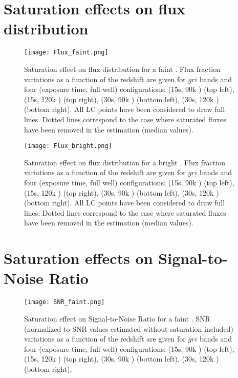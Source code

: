 \begin{appendices}
\section{Saturation effects on flux distribution}

\begin{figure}[htbp]
\begin{center}
  \texttt{[image: Flux\_faint.png]}
 \caption{Saturation effect on flux distribution for a faint \sne. Flux fraction variations as a function of the redshift are given for $gri$ bands and four (exposure time, full well) configurations: (15s, 90k \pe) (top left),  (15s, 120k \pe) (top right), (30s, 90k \pe) (bottom left),  (30s, 120k \pe) (bottom right). All LC points have been considered to draw full lines. Dotted lines correspond to the case where saturated fluxes have been removed in the estimation (median values).}\label{fig:fluxfaint}
\end{center}
\end{figure}

\begin{figure}[htbp]
\begin{center}
  \texttt{[image: Flux\_bright.png]}
  \caption{Saturation effect on flux distribution for a bright \sne. Flux fraction variations as a function of the redshift are given for $gri$ bands and four (exposure time, full well) configurations: (15s, 90k \pe) (top left),  (15s, 120k \pe) (top right), (30s, 90k \pe) (bottom left),  (30s, 120k \pe) (bottom right). All LC points have been considered to draw full lines. Dotted lines correspond to the case where saturated fluxes have been removed in the estimation (median values).}\label{fig:fluxbright}
  
\end{center}
\end{figure}
\newpage
\section{Saturation effects on Signal-to-Noise Ratio}

\begin{figure}[htbp]
\begin{center}
  \texttt{[image: SNR\_faint.png]}
 \caption{Saturation effect on Signal-to-Noise Ratio for a faint \sne. SNR (normalized to SNR values estimated without saturation included) variations as a function of the redshift are given for $gri$ bands and four (exposure time, full well) configurations: (15s, 90k \pe) (top left),  (15s, 120k \pe) (top right), (30s, 90k \pe) (bottom left),  (30s, 120k \pe) (bottom right),}\label{fig:snrfaint}
\end{center}
\end{figure}


\end{appendices}
